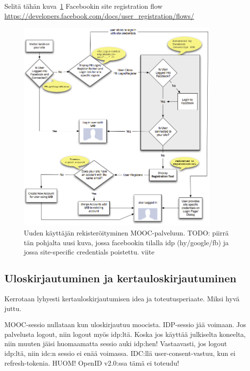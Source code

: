 \documentclass[finnish,gradu]{tktltiki}
\begin{document}
  Selitä tähän kuva~\ref{fig:registration_with_facebook} Facebookin site registration flow \url{https://developers.facebook.com/docs/user_registration/flows/}

  \begin{figure}
    \centering
    \includegraphics[width=0.9\textwidth]{images/facebook_user_registretion.png}
    \caption{Uuden käyttäjän rekisteröityminen MOOC-palveluun. TODO: piirrä tän pohjalta uusi kuva, jossa facebookin tilalla idp (hy/google/fb) ja jossa site-specific credentials poistettu. viite }
    \label{fig:registration_with_facebook}
  \end{figure}



  \subsection{Uloskirjautuminen ja kertauloskirjautuminen} %
  \label{sub:kertauloskirjautuminen}
  Kerrotaan lyhyesti kertauloskirjautumisen idea ja toteutusperiaate. Miksi hyvä juttu.

  MOOC-sessio nullataan kun uloskirjautuu moocista. IDP-sessio jää voimaan. Jos palvelusta logout, niin logout myös idp:ltä. Koska jos käyttää julkiselta koneelta, niin muuten jäisi huomaamatta sessio auki idp:hen! Vastaavasti, jos logout idp:ltä, niin idc:n sessio ei enää voimassa. IDC:llä user-consent-vastuu, kun ei refresh-tokenia. HUOM! OpenID v2.0:ssa tämä ei toteudu!
\end{document}
